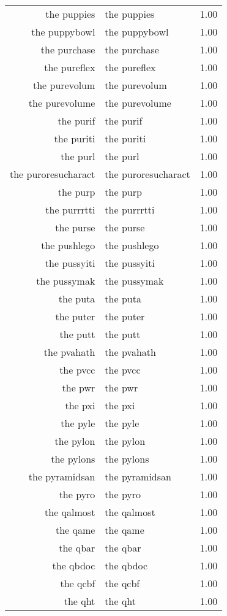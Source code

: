 \begin{table}[ht]
\begin{tabular}{rlr}
  the puppies & the puppies & 1.00 \\ 
  the puppybowl & the puppybowl & 1.00 \\ 
  the purchase & the purchase & 1.00 \\ 
  the pureflex & the pureflex & 1.00 \\ 
  the purevolum & the purevolum & 1.00 \\ 
  the purevolume & the purevolume & 1.00 \\ 
  the purif & the purif & 1.00 \\ 
  the puriti & the puriti & 1.00 \\ 
  the purl & the purl & 1.00 \\ 
  the puroresucharact & the puroresucharact & 1.00 \\ 
  the purp & the purp & 1.00 \\ 
  the purrrtti & the purrrtti & 1.00 \\ 
  the purse & the purse & 1.00 \\ 
  the pushlego & the pushlego & 1.00 \\ 
  the pussyiti & the pussyiti & 1.00 \\ 
  the pussymak & the pussymak & 1.00 \\ 
  the puta & the puta & 1.00 \\ 
  the puter & the puter & 1.00 \\ 
  the putt & the putt & 1.00 \\ 
  the pvahath & the pvahath & 1.00 \\ 
  the pvcc & the pvcc & 1.00 \\ 
  the pwr & the pwr & 1.00 \\ 
  the pxi & the pxi & 1.00 \\ 
  the pyle & the pyle & 1.00 \\ 
  the pylon & the pylon & 1.00 \\ 
  the pylons & the pylons & 1.00 \\ 
  the pyramidsan & the pyramidsan & 1.00 \\ 
  the pyro & the pyro & 1.00 \\ 
  the qalmost & the qalmost & 1.00 \\ 
  the qame & the qame & 1.00 \\ 
  the qbar & the qbar & 1.00 \\ 
  the qbdoc & the qbdoc & 1.00 \\ 
  the qcbf & the qcbf & 1.00 \\ 
  the qht & the qht & 1.00 \\ 

\end{tabular}
\end{table}
